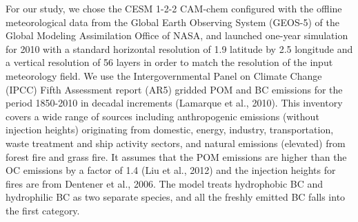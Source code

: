 \documentclass[12pt]{article}
\begin{document}
		For our study, we chose the CESM 1-2-2 CAM-chem configured with the offline meteorological data from the Global Earth Observing System (GEOS-5) of the Global Modeling Assimilation Office of NASA, and launched one-year simulation for 2010 with a standard horizontal resolution of 1.9  latitude by 2.5 longitude and a vertical resolution of 56 layers in order to match the resolution of the input meteorology field. We use the Intergovernmental Panel on Climate Change (IPCC) Fifth Assessment report (AR5) gridded POM and BC emissions for the period 1850-2010 in decadal increments (Lamarque et al., 2010). This inventory covers a wide range of sources including anthropogenic emissions (without injection heights) originating from domestic, energy, industry, transportation, waste treatment and ship activity sectors, and natural emissions (elevated) from forest fire and grass fire. It assumes that the POM emissions are higher than the OC emissions by a factor of 1.4 (Liu et al., 2012) and the injection heights for fires are from Dentener et al., 2006. The model treats hydrophobic BC and hydrophilic BC as two separate species, and all the freshly emitted BC falls into the first category. 
\end{document}
